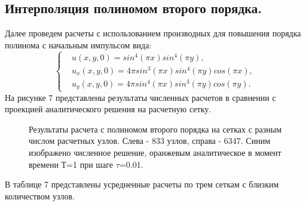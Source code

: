 \documentclass[14pt]{article}
\begin{document}
\subsection{Интерполяция полиномом второго порядка.}
Далее проведем расчеты с использованием производных для повышения порядка полинома с начальным импульсом вида:
\begin{equation}
\left\lbrace
\begin{aligned}
&u(x,y,0) = sin^4(\pi x)sin^4(\pi y),\\
&u_x(x,y,0) =  4\pi sin^3(\pi x) sin^4(\pi y)  cos(\pi x),\\
&u_y(x,y,0) = 4\pi sin^4(\pi x)sin^3(\pi y)cos(\pi y).
\end{aligned}
\right .
\end{equation}
На рисунке 7 представлены результаты численных расчетов в сравнении с проекцией аналитического решения на расчетную сетку.
\begin{figure}[!h!]
\caption{Результаты расчета с полиномом второго порядка на сетках с разным числом расчетных узлов. Слева - 833 узлов, справа - 6347. Синим изображено численное решение, оранжевым аналитическое в момент времени Т=1 при шаге $\tau$=0.01.}
\end{figure}
 В таблице 7 представлены усредненные расчеты по трем сеткам с близким количеством узлов.
\end{document}
